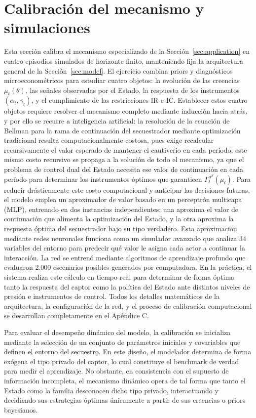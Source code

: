 \documentclass[review,authoryear,12pt]{elsarticle}
\theoremstyle{plain}
\theoremstyle{definition}
\newcommand{\1}{\mathbf{1}}
\begin{document}
\section{Calibración del mecanismo y simulaciones}\label{sec:calibracion}
\normalfont\normalsize
Esta sección calibra el mecanismo especializado de la Sección~\ref{sec:application} en cuatro episodios simulados de horizonte finito, manteniendo fija la arquitectura general de la Sección~\ref{sec:model}. El ejercicio combina priors y diagnósticos microeconométricos para estudiar cuatro objetos: la evolución de las creencias $\mu_t(\theta)$, las señales observadas por el Estado, la respuesta de los instrumentos $(\alpha_t,\gamma_t)$, y el cumplimiento de las restricciones IR e IC. Establecer estos cuatro objetos requiere resolver el mecanismo completo mediante inducción hacia atrás, y por ello se recurre a inteligencia artificial: la resolución de la ecuación de Bellman para la rama de continuación del secuestrador mediante optimización tradicional resulta computacionalmente costosa, pues exige recalcular recursivamente el valor esperado de mantener el cautiverio en cada período; este mismo costo recursivo se propaga a la solución de todo el mecanismo, ya que el problema de control dual del Estado necesita ese valor de continuación en cada período para determinar los instrumentos óptimos que garanticen $\Gamma_t^{a^S}(\mu_t)$. Para reducir drásticamente este costo computacional y anticipar las decisiones futuras, el modelo emplea un aproximador de valor basado en un perceptrón multicapa (MLP), entrenado en dos instancias independientes: una aproxima el valor de continuación que alimenta la optimización del Estado, y la otra aproxima la respuesta óptima del secuestrador bajo su tipo verdadero. Esta aproximación mediante redes neuronales funciona como un simulador avanzado que analiza 34 variables del entorno para predecir qué valor le asigna cada actor a continuar la interacción. La red se entrenó mediante algoritmos de aprendizaje profundo que evaluaron 2.000 escenarios posibles generados por computadora. En la práctica, el sistema realiza este cálculo en tiempo real para determinar de forma óptima tanto la respuesta del captor como la política del Estado ante distintos niveles de presión e instrumentos de control. Todos los detalles matemáticos de la arquitectura, la configuración de la red, y el proceso de calibración computacional se desarrollan completamente en el Apéndice C.

Para evaluar el desempeño dinámico del modelo, la calibración se inicializa mediante la selección de un conjunto de parámetros iniciales y covariables que definen el entorno del secuestro. En este diseño, el modelador determina de forma exógena el tipo privado del captor, lo cual constituye el benchmark de verdad para medir el aprendizaje. No obstante, en consistencia con el supuesto de información incompleta, el mecanismo dinámico opera de tal forma que tanto el Estado como la familia desconocen dicho tipo privado, interactuando y decidiendo sus estrategias óptimas únicamente a partir de sus creencias o priors bayesianos.
\end{document}
